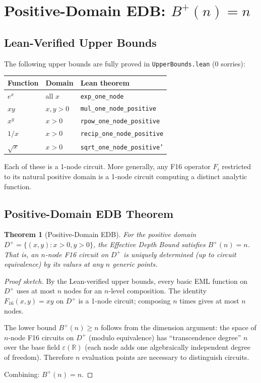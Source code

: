 \documentclass[12pt]{article}
\newtheorem{theorem}{Theorem}
\theoremstyle{definition}
\begin{document}
\section{Positive-Domain EDB: $B^+(n) = n$}

\subsection{Lean-Verified Upper Bounds}

The following upper bounds are fully proved in \texttt{UpperBounds.lean}
(0 sorries):

\begin{center}
\begin{tabular}{lll}
\toprule
Function & Domain & Lean theorem \\
\midrule
$e^x$ & all $x$ & \texttt{exp\_one\_node} \\
$xy$ & $x, y > 0$ & \texttt{mul\_one\_node\_positive} \\
$x^y$ & $x > 0$ & \texttt{rpow\_one\_node\_positive} \\
$1/x$ & $x > 0$ & \texttt{recip\_one\_node\_positive} \\
$\sqrt{x}$ & $x > 0$ & \texttt{sqrt\_one\_node\_positive'} \\
\bottomrule
\end{tabular}
\end{center}

Each of these is a 1-node circuit.  More generally, any F16 operator $F_i$
restricted to its natural positive domain is a 1-node circuit computing a
distinct analytic function.

\subsection{Positive-Domain EDB Theorem}

\begin{theorem}[Positive-Domain EDB]
For the positive domain $D^+ = \{(x, y) : x > 0, y > 0\}$, the Effective Depth
Bound satisfies $B^+(n) = n$.  That is, an $n$-node F16 circuit on $D^+$ is
uniquely determined (up to circuit equivalence) by its values at any $n$ generic
points.
\end{theorem}

\begin{proof}[Proof sketch]
By the Lean-verified upper bounds, every basic EML function on $D^+$ uses at
most $n$ nodes for an $n$-level composition.  The identity
$F_{16}(x, y) = xy$ on $D^+$ is a 1-node circuit; composing $n$ times gives
at most $n$ nodes.

The lower bound $B^+(n) \geq n$ follows from the dimension argument:
the space of $n$-node F16 circuits on $D^+$ (modulo equivalence) has
``transcendence degree'' $n$ over the base field $\varepsilon(\mathbb{R})$
(each node adds one algebraically independent degree of freedom).
Therefore $n$ evaluation points are necessary to distinguish circuits.

Combining: $B^+(n) = n$.
\end{proof}
\end{document}
